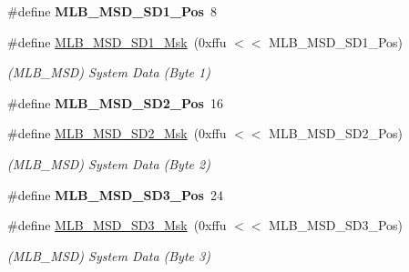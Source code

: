 \begin{DoxyCompactItemize}
\mbox{\label{group__SAMV71__MLB_ga6e30d27fec67feaa2edca0c5d80365f5}} 
\#define {\bfseries M\+L\+B\+\_\+\+M\+S\+D\+\_\+\+S\+D1\+\_\+\+Pos}~8
\item 
\mbox{\label{group__SAMV71__MLB_gae66defb06a4a9d82edb99174e6efc0e6}} 
\#define \mbox{\hyperlink{group__SAMV71__MLB_gae66defb06a4a9d82edb99174e6efc0e6}{M\+L\+B\+\_\+\+M\+S\+D\+\_\+\+S\+D1\+\_\+\+Msk}}~(0xffu $<$$<$ M\+L\+B\+\_\+\+M\+S\+D\+\_\+\+S\+D1\+\_\+\+Pos)
\begin{DoxyCompactList}\small\item\em (M\+L\+B\+\_\+\+M\+SD) System Data (Byte 1) \end{DoxyCompactList}\item 
\mbox{\label{group__SAMV71__MLB_ga943d3c76f26207acdc842b5fe89469ce}} 
\#define {\bfseries M\+L\+B\+\_\+\+M\+S\+D\+\_\+\+S\+D2\+\_\+\+Pos}~16
\item 
\mbox{\label{group__SAMV71__MLB_gafef3570355e500f8974922a61f6eeeb5}} 
\#define \mbox{\hyperlink{group__SAMV71__MLB_gafef3570355e500f8974922a61f6eeeb5}{M\+L\+B\+\_\+\+M\+S\+D\+\_\+\+S\+D2\+\_\+\+Msk}}~(0xffu $<$$<$ M\+L\+B\+\_\+\+M\+S\+D\+\_\+\+S\+D2\+\_\+\+Pos)
\begin{DoxyCompactList}\small\item\em (M\+L\+B\+\_\+\+M\+SD) System Data (Byte 2) \end{DoxyCompactList}\item 
\mbox{\label{group__SAMV71__MLB_ga7c25fca9c990e54c1d277cda96707751}} 
\#define {\bfseries M\+L\+B\+\_\+\+M\+S\+D\+\_\+\+S\+D3\+\_\+\+Pos}~24
\item 
\mbox{\label{group__SAMV71__MLB_ga568a6a8772a0455756271ac4c9ca3435}} 
\#define \mbox{\hyperlink{group__SAMV71__MLB_ga568a6a8772a0455756271ac4c9ca3435}{M\+L\+B\+\_\+\+M\+S\+D\+\_\+\+S\+D3\+\_\+\+Msk}}~(0xffu $<$$<$ M\+L\+B\+\_\+\+M\+S\+D\+\_\+\+S\+D3\+\_\+\+Pos)
\begin{DoxyCompactList}\small\item\em (M\+L\+B\+\_\+\+M\+SD) System Data (Byte 3) \end{DoxyCompactList}\item 
\mbox{\label{group__SAMV71__MLB_gafe4ef13782bab809c28414982da3b04f}} 
$$
\end{DoxyCompactItemize}
